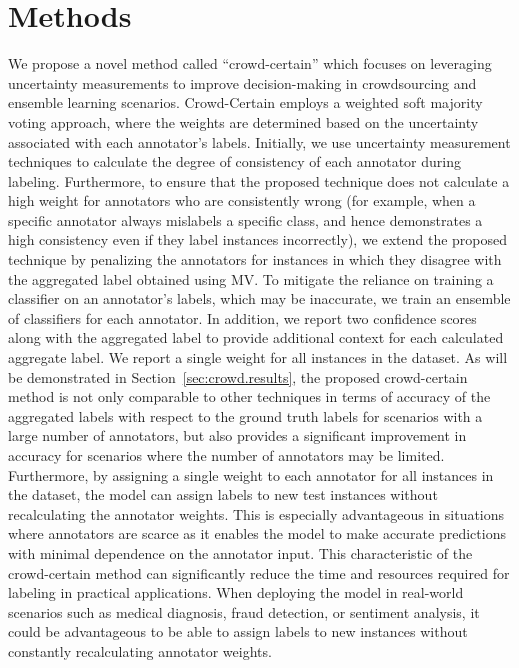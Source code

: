 \section{Methods}\label{sec:crowd.method}
We propose a novel method called ``crowd-certain'' which focuses on leveraging uncertainty measurements to improve decision-making in crowdsourcing and ensemble learning scenarios. Crowd-Certain employs a weighted soft majority voting approach, where the weights are determined based on the uncertainty associated with each annotator's labels. Initially, we use uncertainty measurement techniques to calculate the degree of consistency of each annotator during labeling. Furthermore, to ensure that the proposed technique does not calculate a high weight for annotators who are consistently wrong (for example, when a specific annotator always mislabels a specific class, and hence demonstrates a high consistency even if they label instances incorrectly), we extend the proposed technique by penalizing the annotators for instances in which they disagree with the aggregated label obtained using MV\@. To mitigate the reliance on training a classifier on an annotator's labels, which may be inaccurate, we train an ensemble of classifiers for each annotator. In addition, we report two confidence scores along with the aggregated label to provide additional context for each calculated aggregate label. We report a single weight for all instances in the dataset. As will be demonstrated in Section~\ref{sec:crowd.results}, the proposed crowd-certain method is not only comparable to other techniques in terms of accuracy of the aggregated labels with respect to the ground truth labels for scenarios with a large number of annotators, but also provides a significant improvement in accuracy for scenarios where the number of annotators may be limited. Furthermore, by assigning a single weight to each annotator for all instances in the dataset, the model can assign labels to new test instances without recalculating the annotator weights. This is especially advantageous in situations where annotators are scarce as it enables the model to make accurate predictions with minimal dependence on the annotator input. This characteristic of the crowd-certain method can significantly reduce the time and resources required for labeling in practical applications. When deploying the model in real-world scenarios such as medical diagnosis, fraud detection, or sentiment analysis, it could be advantageous to be able to assign labels to new instances without constantly recalculating annotator weights.
